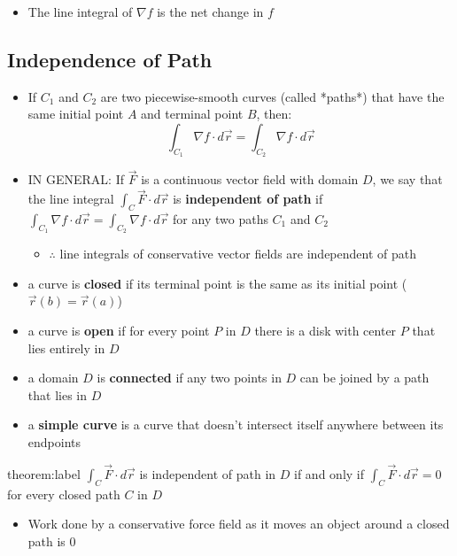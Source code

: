 \documentclass{package/notes}
\begin{document}
\begin{itemize}
	\item The line integral of $\nabla f$ is the net change in $f$
\end{itemize}


\subsection{Independence of Path}

\begin{itemize}
	\item If $C_1$ and $C_2$ are two piecewise-smooth curves (called *paths*) that have the same initial point $A$ and terminal point $B$, then:
	$$\int_{C_1}\nabla f\cdot d\vec r = \int_{C_2}\nabla f\cdot d\vec r$$
	\item IN GENERAL: If $\vec F$ is a continuous vector field with domain $D$, we say that the line integral $\int_C \vec F \cdot d\vec r$ is \textbf{independent of path} if $\int_{C_1}\nabla f\cdot d\vec r = \int_{C_2}\nabla f\cdot d\vec r$ for any two paths $C_1$ and $C_2$
	\begin{itemize}
		\item $\therefore$ line integrals of conservative vector fields are independent of path
	\end{itemize}
	\item a curve is \textbf{closed} if its terminal point is the same as its initial point ($\vec r(b) = \vec r(a)$)
	\item a curve is \textbf{open} if for every point $P$ in $D$ there is a disk with center $P$ that lies entirely in $D$
	\item a domain $D$ is \textbf{connected} if any two points in $D$ can be joined by a path that lies in $D$
	\item a \textbf{simple curve} is a curve that doesn't intersect itself anywhere between its endpoints
\end{itemize}

\begin{theorem}{theorem:label}
	$\int_C \vec F \cdot d\vec r$ is independent of path in $D$ if and only if $\int_C \vec F \cdot d\vec r = 0$ for every closed path $C$ in $D$
\end{theorem}

\begin{itemize}
	\item Work done by a conservative force field as it moves an object around a closed path is $0$
\end{itemize}
\end{document}
